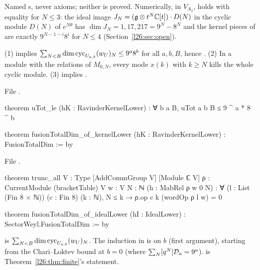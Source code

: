 \begin{status}
Named s, never axioms; neither is proved. Numerically, in $V_{A_2}$,  holds with equality for
$N\le3$: the ideal image $J_N=(\mathfrak g\otimes t^N{\mathbb{C}}[t])\cdot D(N)$ in the cyclic module $D(N)$ of $e^{N\theta}$ has
$\dim J_N=1,17,217=9^N-8^N$ and the kernel pieces of  are exactly $9^{N-1-i}8^i$ for $N\le4$
(Section~\ref{l26:sec:open}).
\end{status}

\begin{theorem}\label{l26:thm:a2red}
(1)  implies $\sum_{N<B}\dim\operatorname{cyc}_{U_{a,b}}(w_U)_N\le9^a8^b$ for all $a,b,B$, hence
. (2) In a module with the relations of $M_{0,N}$, every mode $x(k)$ with $k\ge N$ kills the whole
cyclic module. (3)  implies .
\end{theorem}
\noindent File .
\begin{leancode}
theorem uTot_le (hK : RavinderKernelLower) : ∀ b a B, uTot a b B ≤ 9 ^ a * 8 ^ b

theorem fusionTotalDim_of_kernelLower (hK : RavinderKernelLower) : FusionTotalDim := by
\end{leancode}
\noindent File .
\begin{leancode}
theorem trunc_all {V : Type} [AddCommGroup V] [Module ℂ V] {ρ : CurrentModule (bracketTable) V}
    {w : V} {N : ℕ} (h : MabRel ρ w 0 N) :
    ∀ (l : List (Fin 8 × ℕ)) (c : Fin 8) (k : ℕ), N ≤ k → ρ.op c k (wordOp ρ l w) = 0

theorem fusionTotalDim_of_idealLower (hI : IdealLower) : SectorWeyl.FusionTotalDim := by
\end{leancode}

\begin{dictionary}
 is $\sum_{N<B}\dim\operatorname{cyc}_{U_{a,b}}(w_U)_N$. The induction in  is on $b$ (first
argument), starting from the Chari--Loktev bound at $b=0$ (where $\sum_N[q^N]\mathcal D_a=9^a$). 
is Theorem~\ref{l26:thm:finite}'s statement.
\end{dictionary}

